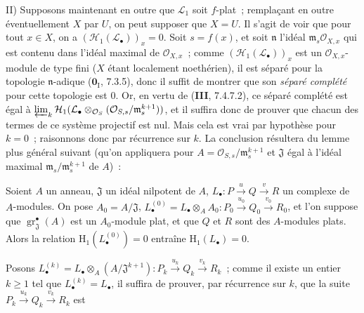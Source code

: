 \medskip
II) Supposons maintenant en outre que $\mathcal L_1$ soit $f$-plat~;
remplaçant en outre éventuellement $X$ par $U$, on peut supposer que $X=U$.
Il s'agit de voir que pour tout $x\in X$, on a
$(\mathcal H_1(\mathcal L_\bullet))_x=0$. Soit $s=f(x)$, et soit
$\mathfrak n$ l'idéal $\mathfrak m_s\mathcal O_{X,x}$ qui est contenu dans
l'idéal maximal de $\mathcal O_{X,x}$~; comme
$(\mathcal H_1(\mathcal L_\bullet))_x$ est un $\mathcal O_{X,x}$-module de type
fini ($X$ étant localement noethérien), il est séparé pour la topologie
$\mathfrak n$-adique ($\mathbf 0_{\mathrm I}$, 7.3.5), donc il suffit de
montrer que son \emph{séparé complété} pour cette topologie est 0. Or, en vertu
de (\textbf{III}, 7.4.7.2), ce séparé complété est égal à
$\varprojlim_k\mathcal H_1(\mathcal L_\bullet\otimes_{\mathcal O_S}
(\mathcal O_{S,s}/\mathfrak m_s^{k+1}))$, et il suffira donc de prouver que
chacun des termes de ce système projectif est nul. Mais cela est vrai par
hypothèse pour $k=0$~; raisonnons donc par récurrence sur $k$. La conclusion
résultera du lemme plus général suivant (qu'on appliquera pour
$A=\mathcal O_{S,s}/\mathfrak m_s^{k+1}$ et $\mathfrak J$ égal à l'idéal
maximal $\mathfrak m_s/\mathfrak m_s^{k+1}$ de $A$)~:

\begin{lemma}[12.3.3.5]
\label{IV.12.3.3.5-fr}
Soient $A$ un anneau, $\mathfrak J$ un idéal nilpotent de $A$,
$L_\bullet:P\xrightarrow{u}Q\xrightarrow{v}R$ un complexe de $A$-modules. On
pose $A_0=A/\mathfrak J$,
$L_\bullet^{(0)}=L_\bullet\otimes_AA_0:
P_0\xrightarrow{u_0}Q_0\xrightarrow{v_0}R_0$, et l'on suppose que
$\operatorname{gr}_{\mathfrak J}^{\bullet}(A)$ est un $A_0$-module plat, et
que $Q$ et $R$ sont des $A$-modules plats. Alors la relation
$\mathrm H_1(L_\bullet^{(0)})=0$ entraîne $\mathrm H_1(L_\bullet)=0$.
\end{lemma}

Posons
$L_\bullet^{(k)}=L_\bullet\otimes_A(A/\mathfrak J^{k+1}):
P_k\xrightarrow{u_k}Q_k\xrightarrow{v_k}R_k$~; comme il existe un entier
$k\geq1$ tel que $L_\bullet^{(k)}=L_\bullet$, il suffira de prouver, par
récurrence sur $k$, que la suite
$P_k\xrightarrow{u_k}Q_k\xrightarrow{v_k}R_k$ est
